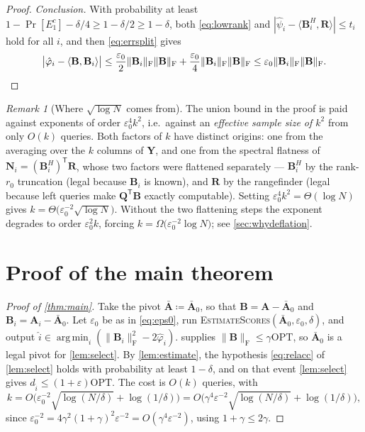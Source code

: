 \documentclass{article}
\renewcommand{\vec}[1]{\mathbf{#1}}          %
\newcommand{\T}{\mathsf{T}}                  %
\newcommand{\F}{\mathrm{F}}                  %
\newcommand{\eps}{\varepsilon}
\newcommand{\OPT}{\mathrm{OPT}}
\newcommand{\inner}[2]{\langle #1, #2 \rangle}
\DeclareMathOperator*{\argmin}{arg\,min}
\theoremstyle{remark}
\newtheorem{remark}[theorem]{Remark}
\begin{document}
\begin{proof}
\emph{Conclusion.}
With probability at least $1 - \Pr[E_1^c] - \delta/4 \ge 1 - \delta/2 \ge 1 - \delta$, both \cref{eq:lowrank} and $|\hat{\psi}_i - \inner{\vec{B}_i^H}{\vec{R}}| \le t_i$ hold for all $i$, and then \cref{eq:errsplit} gives
\[
\bigl|\hat{\varphi}_i - \inner{\vec{B}}{\vec{B}_i}\bigr| \le \frac{\eps_0}{2}\|\vec{B}_i\|_\F\|\vec{B}\|_\F + \frac{\eps_0}{4}\|\vec{B}_i\|_\F\|\vec{B}\|_\F \le \eps_0 \|\vec{B}_i\|_\F\|\vec{B}\|_\F . \qedhere
\]
\end{proof}

\begin{remark}[Where $\sqrt{\log N}$ comes from]\label{rem:k2}
The union bound in the proof is paid against exponents of order $\eps_0^4 k^2$, i.e.\ against an \emph{effective sample size of $k^2$} from only $O(k)$ queries.
Both factors of $k$ have distinct origins: one from the averaging over the $k$ columns of $\vec{Y}$, and one from the spectral flatness of $\vec{N}_i = (\vec{B}_i^H)^\T\vec{R}$, whose two factors were flattened separately --- $\vec{B}_i^H$ by the rank-$r_0$ truncation (legal because $\vec{B}_i$ is known), and $\vec{R}$ by the rangefinder (legal because left queries make $\vec{Q}^\T\vec{B}$ exactly computable).
Setting $\eps_0^4 k^2 = \Theta(\log N)$ gives $k = \Theta\bigl(\eps_0^{-2}\sqrt{\log N}\bigr)$.
Without the two flattening steps the exponent degrades to order $\eps_0^2 k$, forcing $k = \Omega\bigl(\eps_0^{-2}\log N\bigr)$; see \cref{sec:whydeflation}.
\end{remark}

\section{Proof of the main theorem}\label{sec:mainproof}

\begin{proof}[Proof of \cref{thm:main}]
Take the pivot $\bar{\vec{A}} \coloneqq \bar{\vec{A}}_0$, so that $\vec{B} = \vec{A} - \bar{\vec{A}}_0$ and $\vec{B}_i = \vec{A}_i - \bar{\vec{A}}_0$.
Let $\eps_0$ be as in \cref{eq:eps0}, run \textsc{EstimateScores}$(\bar{\vec{A}}_0, \eps_0, \delta)$, and output $\hat{i} \in \argmin_i (\|\vec{B}_i\|_\F^2 - 2\hat{\varphi}_i)$.
 supplies $\|\vec{B}\|_\F \le \gamma\OPT$, so $\bar{\vec{A}}_0$ is a legal pivot for \cref{lem:select}.
By \cref{lem:estimate}, the hypothesis \cref{eq:relacc} of \cref{lem:select} holds with probability at least $1-\delta$, and on that event \cref{lem:select} gives $d_{\hat{i}} \le (1+\eps)\OPT$.
The cost is $O(k)$ queries, with
\[
k = O\bigl( \eps_0^{-2}\sqrt{\log(N/\delta)} + \log(1/\delta) \bigr)
= O\bigl( \gamma^4\eps^{-2}\sqrt{\log(N/\delta)} + \log(1/\delta) \bigr),
\]
since $\eps_0^{-2} = 4\gamma^2(1+\gamma)^2\eps^{-2} = O(\gamma^4\eps^{-2})$, using $1 + \gamma \le 2\gamma$.
\end{proof}
\end{document}
